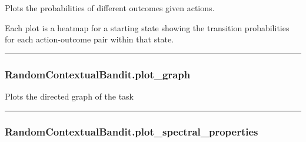 Plots the probabilities of different outcomes given actions.

Each plot is a heatmap for a starting state showing the transition
probabilities for each action-outcome pair within that state.

\begin{center}\rule{0.5\linewidth}{\linethickness}\end{center}

\subsubsection{RandomContextualBandit.plot\_graph}\label{randomcontextualbandit.plot_graph}

\begin{Shaded}
\begin{Highlighting}[]
\OperatorTok{=}\OperatorTok{=}\OperatorTok{=}\OperatorTok{=}\OperatorTok{=}\OperatorTok{=}\OperatorTok{=}\OperatorTok{=}\NormalTok{)}
\end{Highlighting}
\end{Shaded}

Plots the directed graph of the task

\begin{center}\rule{0.5\linewidth}{\linethickness}\end{center}

\subsubsection{RandomContextualBandit.plot\_spectral\_properties}\label{randomcontextualbandit.plot_spectral_properties}

\begin{Shaded}
\begin{Highlighting}[]
\OperatorTok{=}\OperatorTok{=}\OperatorTok{=}\NormalTok{)}
\end{Highlighting}
\end{Shaded}

